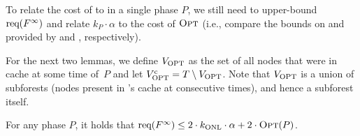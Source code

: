 To relate the cost of \OPT to \ALGTC in a single phase $P$, we still need to
upper-bound $\textrm{req} (F^\infty)$ and relate $k_P \cdot \alpha$ to the cost of
$\textsc{Opt}$ (i.e., compare the bounds on \ALGTC and \OPT provided by
 and , respectively).

For the next two lemmas, we define $V_\textnormal{OPT}$ as the set of all nodes that were
in \OPT cache at some time of~$P$ and let $V_\textnormal{OPT}^\textrm{c} = T \setminus V_\textnormal{OPT}$. Note
that $V_\textnormal{OPT}$ is a union of subforests (nodes present in \OPT's cache at
consecutive times), and hence a subforest itself.

\begin{lemma}
\label{lem:f_infty}
For any phase $P$, it holds that $\textrm{req} (F^\infty) \leq 2 \cdot k_\textnormal{ONL} \cdot
\alpha + 2 \cdot \textsc{Opt}(P)$.
\end{lemma}

